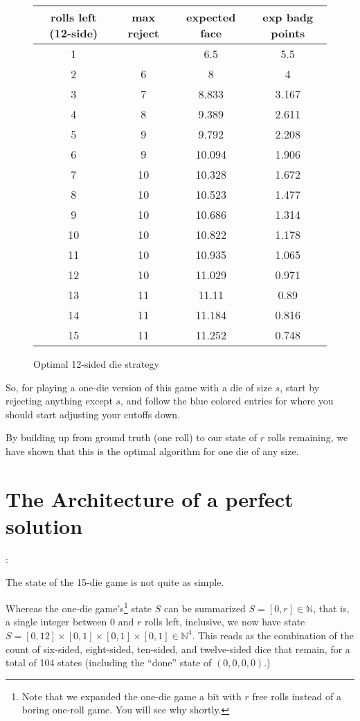 \documentclass[11pt, oneside]{article} 	%
\begin{document}
\begin{figure}[!htb]
\begin{tabular}{c | c c c}
rolls left (12-side) & max reject & expected face & exp badg points \\
\hline

1 &  & 6.5 & 5.5 \\
2 & \cellcolor{cyan} 6 & 8 & 4 \\
3 & \cellcolor{cyan} 7 & 8.833 & 3.167 \\
4 &\cellcolor{cyan}  8 & 9.389 & 2.611 \\
5 & 9 & 9.792 & 2.208 \\
6 & \cellcolor{cyan} 9 & 10.094 & 1.906 \\
7 & 10 & 10.328 & 1.672 \\
8 & 10 & 10.523 & 1.477 \\
9 & 10 & 10.686 & 1.314 \\
10 & 10 & 10.822 & 1.178 \\
11 & 10 & 10.935 & 1.065 \\
12 & \cellcolor{cyan} 10 & 11.029 & 0.971 \\
13 & 11 & 11.11 & 0.89 \\
14 & 11 & 11.184 & 0.816 \\
15 & 11 & 11.252 & 0.748 \\
\end{tabular}
\caption{Optimal 12-sided die strategy}
\label{fig:optimal12}
\end{figure}

So, for playing a one-die version of this game with a die of size $s$, start by rejecting anything except $s$, and follow the blue colored entries for where you should start adjusting your cutoffs down.  

By building up from ground truth (one roll) to our state of $r$ rolls remaining, we have shown that this is the optimal algorithm for one die of any size.

\section{The Architecture of a perfect solution} \label{section:solve-perfect}: 

The state of the 15-die game is not quite as simple.

Whereas the one-die game's\footnote{Note that we expanded the one-die game a bit with $r$ free rolls instead of a boring one-roll game.  You will see why shortly.} state $S$  can be summarized $S = [0,r] \in \mathbb{N}$, that is, a single integer between $0$ and $r$ rolls left, inclusive, we now have state $S = [0,12] \times [0,1] \times [0,1] \times [0,1] \in \mathbb{N}^4$.  This reads as the combination of the count of six-sided, eight-sided, ten-sided, and twelve-sided dice that remain, for a total of 104 states (including the ``done'' state of $(0,0,0,0)$.)
\end{document}
